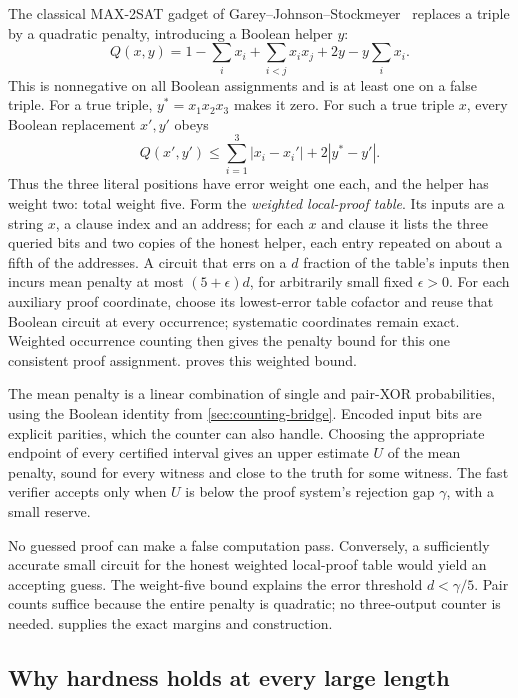 \documentclass[11pt,letterpaper]{article}
\theoremstyle{definition}
\theoremstyle{remark}
\begin{document}
The classical MAX-2SAT gadget of
Garey--Johnson--Stockmeyer~\cite{GJS76} replaces a triple by a
quadratic penalty, introducing a Boolean helper \(y\):
\[
 Q(x,y)=1-\sum_i x_i+\sum_{i<j}x_ix_j+2y-y\sum_i x_i.
\]
This is nonnegative on all Boolean assignments and is at least one
on a false triple. For a true triple, \(y^*=x_1x_2x_3\) makes it
zero. For such a true triple \(x\), every Boolean replacement
\(x',y'\) obeys
\[
 Q(x',y')\le\sum_{i=1}^3|x_i-x_i'|+2|y^*-y'|.
\]
Thus the three literal positions have error weight one each, and
the helper has weight two: total weight five. Form the
\emph{weighted local-proof table}. Its inputs are a string \(x\), a
clause index and an address; for each \(x\) and clause it lists the
three queried bits and two copies of the honest helper, each entry
repeated on about a fifth of the addresses. A circuit that errs on a
\(d\) fraction of the table's inputs then incurs mean penalty at most
\((5+\epsilon)d\), for arbitrarily small fixed \(\epsilon>0\).
For each auxiliary proof coordinate, choose its lowest-error table
cofactor and reuse that Boolean circuit at every occurrence;
systematic coordinates remain exact. Weighted occurrence counting
then gives the penalty bound for this one consistent proof assignment.
 proves this weighted bound.

The mean penalty is a linear combination of single and pair-XOR
probabilities, using the Boolean identity from
\cref{sec:counting-bridge}. Encoded input bits are explicit parities,
which the counter can also handle. Choosing the appropriate endpoint
of every certified interval gives an upper estimate \(U\) of the
mean penalty, sound for every witness and close to the truth for
some witness. The fast verifier accepts only when \(U\) is below
the proof system's rejection gap \(\gamma\), with a small reserve.

No guessed proof can make a false computation pass. Conversely, a
sufficiently accurate small circuit for the honest weighted local-proof
table would yield an accepting guess. The weight-five bound explains
the error threshold \(d<\gamma/5\). Pair counts suffice because
the entire penalty is quadratic; no three-output counter is needed.
 supplies the exact margins and construction.

\subsection{Why hardness holds at every large length}\label{sec:overview-ae}
\end{document}
